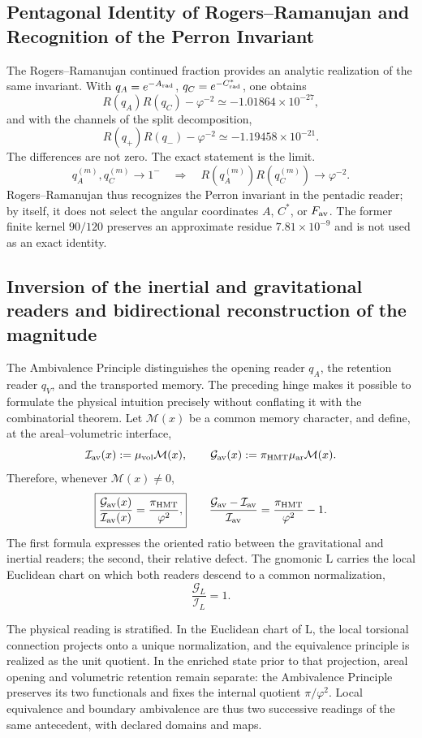 \subsection{Pentagonal Identity of Rogers--Ramanujan and Recognition of the Perron Invariant}

The Rogers--Ramanujan continued fraction provides an analytic realization
of the same invariant. With \(q_A=e^{-A_{\rm rad}}\), \(q_C=e^{-C^*_{\rm rad}}\), one obtains
\[
 R(q_A)R(q_C)-\varphi^{-2}\simeq-1.01864\times10^{-27},
\]
and with the channels of the split decomposition,
\[
 R(q_+)R(q_-)-\varphi^{-2}\simeq-1.19458\times10^{-21}.
\]
The differences are not zero. The exact statement is the limit.
\[
 q_A^{(m)},q_C^{(m)}\to1^-
 \quad\Longrightarrow\quad
 R(q_A^{(m)})R(q_C^{(m)})\to\varphi^{-2}.
\]
Rogers--Ramanujan thus recognizes the Perron invariant in the
pentadic reader; by itself, it does not select the angular coordinates \(A\), \(C^*\), or
\(F_{\rm av}\). The former finite kernel \(90/120\) preserves an approximate
residue \(7.81\times10^{-9}\) and is not used as an exact identity.

\subsection{Inversion of the inertial and gravitational readers and bidirectional reconstruction of the magnitude}

The Ambivalence Principle distinguishes the opening reader \(q_A\), the retention reader \(q_V\), and the transported memory. The preceding hinge makes it possible to formulate the physical intuition precisely without conflating it with the combinatorial theorem. Let \(\mathcal M(x)\) be a common memory character, and define, at the areal--volumetric interface,
\[
 \mathcal I_{\rm av}(x)
 :=\mu_{\rm vol}\mathcal M(x),
 \qquad
 \mathcal G_{\rm av}(x)
 :=\pi_{\rm HMT}\mu_{\rm ar}\mathcal M(x).
\]
Therefore, whenever \(\mathcal M(x)\ne0\),
\[
 \boxed{
 \frac{\mathcal G_{\rm av}(x)}{\mathcal I_{\rm av}(x)}
 =\frac{\pi_{\rm HMT}}{\varphi^2},}
 \qquad
 \frac{\mathcal G_{\rm av}-\mathcal I_{\rm av}}
 {\mathcal I_{\rm av}}
 =\frac{\pi_{\rm HMT}}{\varphi^2}-1.
\]
The first formula expresses the oriented ratio between the gravitational
and inertial readers; the second, their relative defect. The gnomonic L
carries the local Euclidean chart on which both readers descend to a
common normalization,
\[
 \frac{\mathcal G_{L}}{\mathcal I_{L}}=1.
\]

The physical reading is stratified. In the Euclidean chart of L, the
local torsional connection projects onto a unique normalization, and the
equivalence principle is realized as the unit quotient. In the enriched
state prior to that projection, areal opening and volumetric retention
remain separate: the Ambivalence Principle preserves its two
functionals and fixes the internal quotient \(\pi/\varphi^2\). Local equivalence
and boundary ambivalence are thus two successive readings of the
same antecedent, with declared domains and maps.

